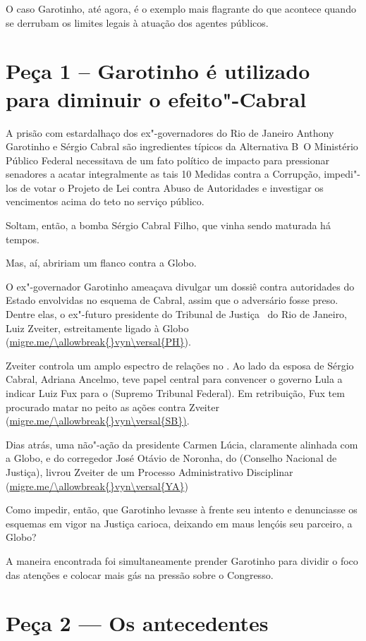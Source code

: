 O caso Garotinho, até agora, é o exemplo mais flagrante do que acontece
quando se derrubam os limites legais à atuação dos agentes públicos.

\section{Peça 1 -- Garotinho é utilizado para diminuir o efeito"-Cabral}

A prisão com estardalhaço dos ex"-governadores do Rio de Janeiro Anthony
Garotinho e Sérgio Cabral são ingredientes típicos da Alternativa B\,
O Ministério Público Federal necessitava de um fato político de impacto
para pressionar senadores a acatar integralmente as tais 10 Medidas
contra a Corrupção, impedi"-los de votar o Projeto de Lei contra Abuso de
Autoridades e investigar os vencimentos acima do teto no serviço
público.

Soltam, então, a bomba Sérgio Cabral Filho, que vinha sendo maturada há
tempos.

Mas, aí, abririam um flanco contra a Globo.

O ex"-governador Garotinho ameaçava divulgar um dossiê contra autoridades
do Estado envolvidas no esquema de Cabral, assim que o adversário fosse
preso. Dentre elas, o ex"-futuro presidente do Tribunal de Justiça ~do
Rio de Janeiro, Luiz Zveiter, estreitamente ligado à Globo
(\url{migre.me/\allowbreak{}vyn\versal{PH}}).

Zveiter controla um amplo espectro de relações no . Ao lado da
esposa de Sérgio Cabral, Adriana Ancelmo, teve papel central para
convencer o governo Lula a indicar Luiz Fux para o  (Supremo Tribunal
Federal). Em retribuição, Fux tem procurado matar no peito as ações
contra Zveiter (\url{migre.me/\allowbreak{}vyn\versal{SB})}.

Dias atrás, uma não"-ação da presidente Carmen Lúcia, claramente alinhada
com a Globo, e do corregedor José Otávio de Noronha, do  (Conselho
Nacional de Justiça), livrou Zveiter de um Processo Administrativo
Disciplinar (\url{migre.me/\allowbreak{}vyn\versal{YA}})

Como impedir, então, que Garotinho levasse à frente seu intento e
denunciasse os esquemas em vigor na Justiça carioca, deixando em maus
lençóis seu parceiro, a Globo?

A maneira encontrada foi simultaneamente prender Garotinho para dividir
o foco das atenções e colocar mais gás na pressão sobre o Congresso.

\section{Peça 2 --- Os antecedentes}

